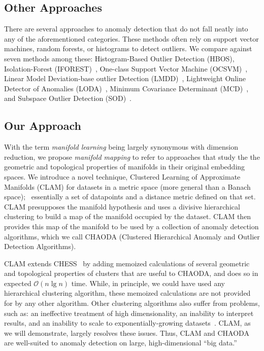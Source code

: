 \subsection{Other Approaches}
\label{subsec:introduction:other-appraoches}

There are several approaches to anomaly detection that do not fall neatly into any of the aforementioned categories.
These methods often rely on support vector machines, random forests, or histograms to detect outliers.
We compare against seven methods among these:
Histogram-Based Outlier Detection (HBOS)\cite{goldstein2012histogram},
Isolation-Forest (IFOREST)~\cite{tony2008iforest,tony2012iforest},
One-class Support Vector Machine (OCSVM)~\cite{sholkopf2001ocsvm},
Linear Model Deviation-base outlier Detection (LMDD)~\cite{arning1996linear},
Lightweight Online Detector of Anomalies (LODA)~\cite{pevny2016loda},
Minimum Covariance Determinant (MCD)~\cite{rousseeuw1999mcd,hardin2004mcd}, and
Subspace Outlier Detection (SOD)~\cite{kriegel2009sod}.


\subsection{Our Approach}
\label{subsec:introduction:chaoda}

With the term \emph{manifold learning} being largely synonymous with dimension reduction, we propose \emph{manifold mapping} to refer to approaches that study the the geometric and topological properties of manifolds in their original embedding spaces.
We introduce a novel technique, Clustered Learning of Approximate Manifolds (CLAM) for datasets in a metric space (more general than a Banach space);~\cite{banach1929fonctionnelles} essentially a set of datapoints and a distance metric defined on that set.
CLAM presupposes the manifold hypothesis and uses a divisive hierarchical clustering to build a map of the manifold occupied by the dataset.
CLAM then provides this map of the manifold to be used by a collection of anomaly detection algorithms, which we call CHAODA (Clustered Hierarchical Anomaly and Outlier Detection Algorithms).

CLAM extends CHESS~\cite{ishaq2019clustered} by adding memoized calculations of several geometric and topological properties of clusters that are useful to CHAODA, and does so in expected $\mathcal{O}(n \lg n)$ time.
While, in principle, we could have used any hierarchical clustering algorithm, these memoized calculations are not provided for by any other algorithm.
Other clustering algorithms also suffer from problems, such as:
an ineffective treatment of high dimensionality,
an inability to interpret results, and
an inability to scale to exponentially-growing datasets~\cite{agrawal1998automatic}.
CLAM, as we will demonstrate, largely resolves these issues.
Thus, CLAM and CHAODA are well-suited to anomaly detection on large, high-dimensional ``big data.''

